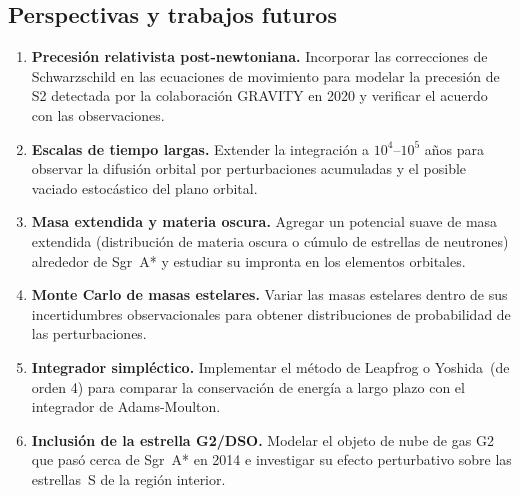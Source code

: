 \documentclass[12pt,a4paper]{article}
\newcommand{\SgrA}{Sgr~A*}
\begin{document}
\subsection{Perspectivas y trabajos futuros}
\label{subsec:futuro}

\begin{enumerate}[label=\textbf{F\arabic*.}, itemsep=3pt]
  \item \textbf{Precesión relativista post-newtoniana.} Incorporar las correcciones
    de Schwarzschild en las ecuaciones de movimiento para modelar la precesión de S2
    detectada por la colaboración GRAVITY en 2020 y verificar el acuerdo con las
    observaciones.
  \item \textbf{Escalas de tiempo largas.} Extender la integración a
    $10^4$--$10^5$ años para observar la difusión orbital por perturbaciones
    acumuladas y el posible vaciado estocástico del plano orbital.
  \item \textbf{Masa extendida y materia oscura.} Agregar un potencial suave de
    masa extendida (distribución de materia oscura o cúmulo de estrellas de neutrones)
    alrededor de \SgrA{} y estudiar su impronta en los elementos orbitales.
  \item \textbf{Monte Carlo de masas estelares.} Variar las masas estelares dentro
    de sus incertidumbres observacionales para obtener distribuciones de probabilidad
    de las perturbaciones.
  \item \textbf{Integrador simpléctico.} Implementar el método de Leapfrog o
    Yoshida~(de orden 4) para comparar la conservación de energía a largo plazo con
    el integrador de Adams-Moulton.
  \item \textbf{Inclusión de la estrella G2/DSO.} Modelar el objeto de nube de gas
    G2 que pasó cerca de \SgrA{} en 2014 e investigar su efecto perturbativo sobre
    las estrellas~S de la región interior.
\end{enumerate}

\newpage


\end{document}
